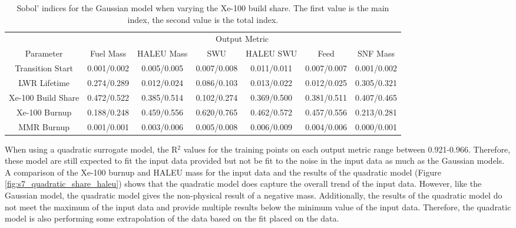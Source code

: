 \begin{table}
    \centering
    \caption{Sobol' indices for the Gaussian model when varying the 
    Xe-100 build share. The first value is the 
    main index, the second value is the total index.}
    \label{tab:s7_sobol_xe100_gaussian}
    \begin{tabular}{c c c c c c c}
        \hline
        & \multicolumn{6}{c}{Output Metric} \\
        Parameter & Fuel Mass & HALEU Mass & SWU & HALEU SWU & Feed & SNF Mass \\
        \hline
        Transition Start & 0.001/0.002 & 0.005/0.005 & 0.007/0.008 &
                           0.011/0.011 & 0.007/0.007 & 0.001/0.002\\
        LWR Lifetime & 0.274/0.289 & 0.012/0.024 & 0.086/0.103 & 
                       0.013/0.022 & 0.012/0.025 & 0.305/0.321 \\
        Xe-100 Build Share & \cellcolor{green!25}0.472/0.522 & \cellcolor{green!25}0.385/0.514 & 0.102/0.274 &
        \cellcolor{green!25}0.369/0.500 & \cellcolor{green!25}0.381/0.511 & 0.407/0.465\\
        Xe-100 Burnup & 0.188/0.248 & \cellcolor{green!25}0.459/0.556 & \cellcolor{green!25}0.620/0.765 & 
        \cellcolor{green!25}0.462/0.572 & \cellcolor{green!25}0.457/0.556 & 0.213/0.281\\
        MMR Burnup & 0.001/0.001 & 0.003/0.006 & 0.005/0.008 & 
                    0.006/0.009 & 0.004/0.006 & 0.000/0.001\\
        \hline        
    \end{tabular}
\end{table}

When using a quadratic surrogate model, the R$^2$ values for the training points on 
each output metric range between 0.921-0.966. Therefore, these model are still expected to 
fit the input data provided but not be fit to the noise in the input data 
as much as the Gaussian models. A comparison of the Xe-100 burnup and \gls{HALEU} 
mass for the input data and the results of the quadratic model (Figure 
\ref{fig:s7_quadratic_share_haleu}) shows that the quadratic model does 
capture the overall trend of the input data. However, like the Gaussian model, 
the quadratic model gives the non-physical result of a negative mass. Additionally, 
the results of the quadratic model do not meet the maximum of the input data and 
provide multiple results below the minimum value of the input data. Therefore, 
the quadratic model is also performing some extrapolation of the data based on the 
fit placed on the data.

